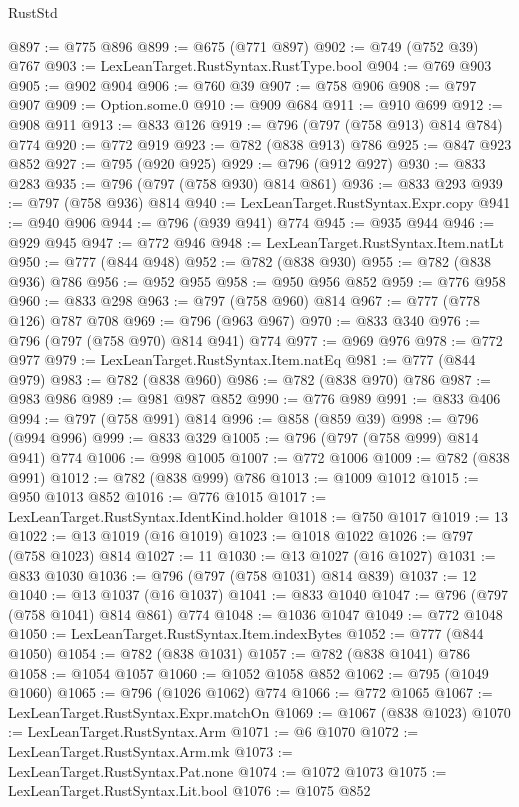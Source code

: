 \begin{lexlean}{RustStd}
\begin{coremodule}
{\begin{coremodule}
{{{{{{{{{{{{{{@897 := @775 @896
@899 := @675 (@771 @897)
@902 := @749 (@752 @39) @767
@903 := LexLeanTarget.RustSyntax.RustType.bool
@904 := @769 @903
@905 := @902 @904
@906 := @760 @39
@907 := @758 @906
@908 := @797 @907
@909 := Option.some.{0}
@910 := @909 @684
@911 := @910 @699
@912 := @908 @911
@913 := @833 @126
@919 := @796 (@797 (@758 @913) @814 @784) @774
@920 := @772 @919
@923 := @782 (@838 @913) @786
@925 := @847 @923 @852
@927 := @795 (@920 @925)
@929 := @796 (@912 @927)
@930 := @833 @283
@935 := @796 (@797 (@758 @930) @814 @861)
@936 := @833 @293
@939 := @797 (@758 @936) @814
@940 := LexLeanTarget.RustSyntax.Expr.copy
@941 := @940 @906
@944 := @796 (@939 @941) @774
@945 := @935 @944
@946 := @929 @945
@947 := @772 @946
@948 := LexLeanTarget.RustSyntax.Item.natLt
@950 := @777 (@844 @948)
@952 := @782 (@838 @930)
@955 := @782 (@838 @936) @786
@956 := @952 @955
@958 := @950 @956 @852
@959 := @776 @958
@960 := @833 @298
@963 := @797 (@758 @960) @814
@967 := @777 (@778 @126) @787 @708
@969 := @796 (@963 @967)
@970 := @833 @340
@976 := @796 (@797 (@758 @970) @814 @941) @774
@977 := @969 @976
@978 := @772 @977
@979 := LexLeanTarget.RustSyntax.Item.natEq
@981 := @777 (@844 @979)
@983 := @782 (@838 @960)
@986 := @782 (@838 @970) @786
@987 := @983 @986
@989 := @981 @987 @852
@990 := @776 @989
@991 := @833 @406
@994 := @797 (@758 @991) @814
@996 := @858 (@859 @39)
@998 := @796 (@994 @996)
@999 := @833 @329
@1005 := @796 (@797 (@758 @999) @814 @941) @774
@1006 := @998 @1005
@1007 := @772 @1006
@1009 := @782 (@838 @991)
@1012 := @782 (@838 @999) @786
@1013 := @1009 @1012
@1015 := @950 @1013 @852
@1016 := @776 @1015
@1017 := LexLeanTarget.RustSyntax.IdentKind.holder
@1018 := @750 @1017
@1019 := 13
@1022 := @13 @1019 (@16 @1019)
@1023 := @1018 @1022
@1026 := @797 (@758 @1023) @814
@1027 := 11
@1030 := @13 @1027 (@16 @1027)
@1031 := @833 @1030
@1036 := @796 (@797 (@758 @1031) @814 @839)
@1037 := 12
@1040 := @13 @1037 (@16 @1037)
@1041 := @833 @1040
@1047 := @796 (@797 (@758 @1041) @814 @861) @774
@1048 := @1036 @1047
@1049 := @772 @1048
@1050 := LexLeanTarget.RustSyntax.Item.indexBytes
@1052 := @777 (@844 @1050)
@1054 := @782 (@838 @1031)
@1057 := @782 (@838 @1041) @786
@1058 := @1054 @1057
@1060 := @1052 @1058 @852
@1062 := @795 (@1049 @1060)
@1065 := @796 (@1026 @1062) @774
@1066 := @772 @1065
@1067 := LexLeanTarget.RustSyntax.Expr.matchOn
@1069 := @1067 (@838 @1023)
@1070 := LexLeanTarget.RustSyntax.Arm
@1071 := @6 @1070
@1072 := LexLeanTarget.RustSyntax.Arm.mk
@1073 := LexLeanTarget.RustSyntax.Pat.none
@1074 := @1072 @1073
@1075 := LexLeanTarget.RustSyntax.Lit.bool
@1076 := @1075 @852
}}}}}}}}}}}}}}
\end{coremodule}}
\end{coremodule}
\end{lexlean}

